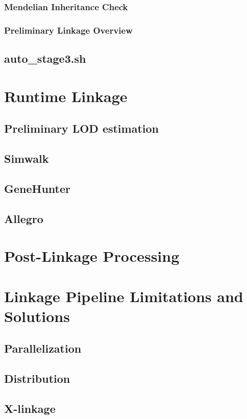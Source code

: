 \subsubsection{Mendelian Inheritance Check}
\subsubsection{Preliminary Linkage Overview}

\subsection{auto\_stage3.sh}


\section{Runtime Linkage}
\subsection{Preliminary LOD estimation}
\subsection{Simwalk}
\subsection{GeneHunter}
\subsection{Allegro}

\section{Post-Linkage Processing}

\section{Linkage Pipeline Limitations and Solutions}
\subsection{Parallelization}
\subsection{Distribution}
\subsection{X-linkage}

